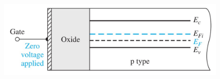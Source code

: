 \documentclass{beamer}
\begin{document}
\begin{frame}
\begin{minipage}{\linewidth}
\begin{minipage}{0.45\linewidth}
\begin{figure}[H]
                    \label{fig:MOS-graph-vertical.jpg}
                \end{figure}
            \end{minipage}
        \end{minipage}
        \begin{minipage}{\linewidth}
            \begin{figure}[H]
                \centering
                \includegraphics[width=0.6\linewidth]{PMOS-zero-gate-voltage-energy-band-diagram.jpg}
                \label{fig:PMOS-zero-gate-voltage-energy-band-diagram.jpg}
            \end{figure}
        \end{minipage}
    \end{frame}
\end{document}
